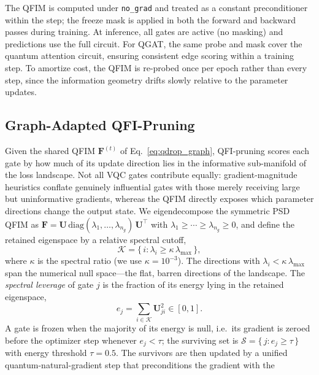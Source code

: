\documentclass[journal]{IEEEtran}
\begin{document}
The QFIM is computed under \texttt{no\_grad} and treated as a constant
preconditioner within the step; the freeze mask is applied in both the
forward and backward passes during training. At inference, all gates are
active (no masking) and predictions use the full circuit. For QGAT, the
same probe and mask cover the quantum attention circuit, ensuring
consistent edge scoring within a training step. To amortize cost, the
QFIM is re-probed once per epoch rather than every step, since the
information geometry drifts slowly relative to the parameter updates.

\subsection{Graph-Adapted QFI-Pruning}
\label{ssec:sp}

Given the shared QFIM $\mathbf{F}^{(t)}$ of Eq.~\eqref{eq:qdrop_graph},
QFI-pruning scores each gate by how much of its update direction lies in
the informative sub-manifold of the loss landscape. Not all VQC gates
contribute equally: gradient-magnitude heuristics conflate genuinely
influential gates with those merely receiving large but uninformative
gradients, whereas the QFIM directly exposes which parameter directions
change the output state. We eigendecompose the symmetric PSD QFIM as
$\mathbf{F} = \mathbf{U}\,\mathrm{diag}(\lambda_1,\ldots,\lambda_{n_g})\,\mathbf{U}^\top$
with $\lambda_1 \geq \cdots \geq \lambda_{n_g} \geq 0$, and define the
retained eigenspace by a relative spectral cutoff,
\begin{equation}
  \mathcal{K} = \bigl\{\, i : \lambda_i \geq \kappa\,\lambda_{\max} \,\bigr\},
  \label{eq:sp_accum_graph}
\end{equation}
where $\kappa$ is the spectral ratio (we use $\kappa=10^{-3}$). The
directions with $\lambda_i < \kappa\,\lambda_{\max}$ span the numerical
null space---the flat, barren directions of the landscape. The
\emph{spectral leverage} of gate $j$ is the fraction of its energy lying
in the retained eigenspace,
\begin{equation}
  e_j = \sum_{i \in \mathcal{K}} \mathbf{U}_{ji}^2 \in [0,1].
  \label{eq:sp_prob}
\end{equation}
A gate is frozen when the majority of its energy is null, i.e.\ its
gradient is zeroed before the optimizer step whenever $e_j < \tau$; the
surviving set is $\mathcal{S} = \{\, j : e_j \geq \tau \,\}$ with energy
threshold $\tau = 0.5$. The survivors are then updated by a unified
quantum-natural-gradient step that preconditions the gradient with the
\end{document}
